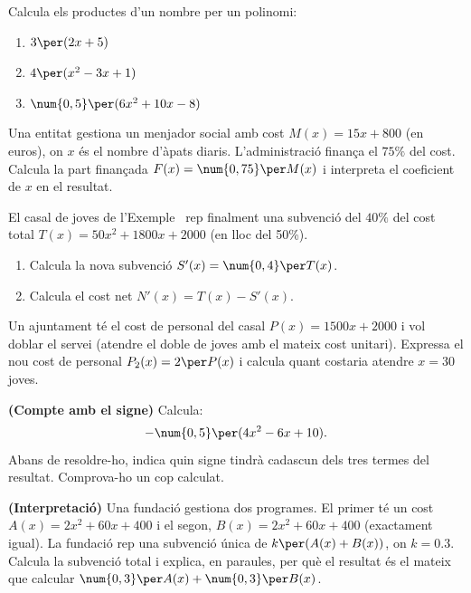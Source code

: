 \begin{exercicis}
\begin{exlist}
  \item Calcula els productes d'un nombre per un polinomi:
    \begin{enumerate}[label=\alph*), leftmargin=1.6em, topsep=2pt]
      \item $3\per(2x + 5)$
      \item $4\per(x^2 - 3x + 1)$
      \item $\num{0,5}\per(6x^2 + 10x - 8)$
    \end{enumerate}

  \item Una entitat gestiona un menjador social amb cost
        $M(x) = 15x + 800$ (en euros), on $x$ és el nombre
        d'àpats diaris. L'administració finança el $75\%$ del cost.
        Calcula la part finançada $F(x) = \num{0,75}\per M(x)$ i
        interpreta el coeficient de $x$ en el resultat.

  \item El casal de joves de l'Exemple~\theexemple{} rep finalment una
        subvenció del $40\%$ del cost total $T(x)=50x^2+\num{1800}x+\num{2000}$
        (en lloc del 50\%).
    \begin{enumerate}[label=\alph*), leftmargin=1.6em, topsep=2pt]
      \item Calcula la nova subvenció $S'(x) = \num{0,4}\per T(x)$.
      \item Calcula el cost net $N'(x) = T(x) - S'(x)$.
    \end{enumerate}

  \item Un ajuntament té el cost de personal del casal $P(x)=\num{1500}x+\num{2000}$
        i vol doblar el servei (atendre el doble de joves amb el mateix
        cost unitari). Expressa el nou cost de personal $P_2(x) = 2\per P(x)$
        i calcula quant costaria atendre $x=30$ joves.

  \item \textbf{(Compte amb el signe)} Calcula:
        \[
        -\num{0,5}\per(4x^2 - 6x + 10).
        \]
        Abans de resoldre-ho, indica quin signe tindrà cadascun dels tres
        termes del resultat. Comprova-ho un cop calculat.

  \item \textbf{(Interpretació)} Una fundació gestiona dos programes. El
        primer té un cost $A(x) = 2x^2 + 60x + 400$ i el segon,
        $B(x) = 2x^2 + 60x + 400$ (exactament igual).
        La fundació rep una subvenció única de $k\per(A(x)+B(x))$, on $k=\num{0,3}$.
        Calcula la subvenció total i explica, en paraules, per
        què el resultat és el mateix que calcular $\num{0,3}\per A(x)+\num{0,3}\per B(x)$.
\end{exlist}
\end{exercicis}

